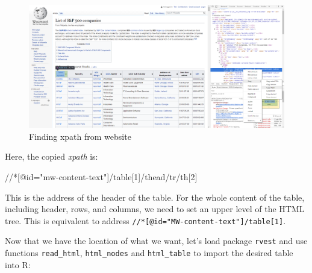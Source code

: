 \documentclass[
  12pt,
]{book}
\newenvironment{Shaded}{\begin{snugshade}}{\end{snugshade}}
\newcommand{\StringTok}[1]{\textcolor[rgb]{0.5,0.5,0.5}{#1}}
\begin{document}
\begin{figure}[!htbp]

{\centering \includegraphics[width=0.75\linewidth]{figs/SP500-Wikipedia_webscraping} 

}

\caption{Finding xpath from website}\label{fig:SP500-Wikipedia-webscraping}
\end{figure}

Here, the copied \emph{xpath} is:

\begin{Shaded}
\begin{Highlighting}[]
\StringTok{\textquotesingle{}//*[@id="mw{-}content{-}text"]/table[1]/thead/tr/th[2]\textquotesingle{}}
\end{Highlighting}
\end{Shaded}

This is the address of the header of the table. For the whole content of the table, including header, rows, and columns, we need to set an upper level of the HTML tree. This is equivalent to address \texttt{//*{[}@id="MW-content-text"{]}/table{[}1{]}}.

Now that we have the location of what we want, let's load package \texttt{rvest} \citep{R-rvest} and use functions \texttt{read\_html}, \texttt{html\_nodes} and \texttt{html\_table} to import the desired table into R:    
\end{document}
